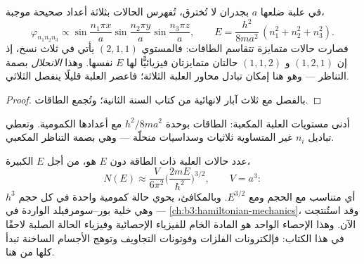 \begin{proposition}\label{prop:b3:schrodinger-three-dimensions:box}
في علبة ضلعها $a$ بجدران لا تُخترق، تُفهرس الحالات
بثلاثة أعداد صحيحة موجبة،
\[
\varphi_{n_1n_2n_3} \propto
\sin\frac{n_1\pi x}{a}\sin\frac{n_2\pi y}{a}\sin\frac{n_3\pi z}{a} ,
\qquad
E = \frac{h^2}{8ma^2}\,(n_1^2 + n_2^2 + n_3^2) .
\]
فصارت حالات متمايزة تتقاسم الطاقات: فالمستوي $(2,1,1)$ يأتي في
ثلاث نسخ، إذ إن $(1,2,1)$ و $(1,1,2)$ حالتان متمايزتان
فيزيائيًّا لها $E$ نفسها. وهذا \emph{الانحلال} بصمة
التناظر --- وهو هنا إمكان تبادل محاور العلبة الثلاثة؛
فاعصر العلبة قليلًا ينفصل الثلاثي.
\end{proposition}

\begin{proof}
بالفصل مع ثلاث آبار لانهائية من كتاب السنة الثانية؛ وتُجمع
الطاقات.
\end{proof}

\begin{omfigure}

{\small أدنى مستويات العلبة المكعبة: الطاقات بوحدة
$h^2/8ma^2$ مع أعدادها الكمومية. وتعطي تباديل $n_i$ غير
المتساوية ثلاثيات وسداسيات منحلّة --- وهي بصمة
التناظر المكعبي.}
\end{omfigure}

\begin{proposition}\label{prop:b3:schrodinger-three-dimensions:counting}
عدد حالات العلبة ذات الطاقة دون $E$ هو، من أجل $E$ الكبيرة،
\[
N(E) \approx \frac{V}{6\pi^2}\Big(\frac{2mE}{\hbar^2}\Big)^{3/2} ,
\qquad V = a^3 :
\]
أي متناسب مع الحجم ومع $E^{3/2}$. وبالمكافئ، يحوي  حالة كمومية واحدة في كل حجم $h^3$ --- وهي خلية
بور--سومرفيلد الواردة في
\cref{ch:b3:hamiltonian-mechanics}، وقد استُنتجت الآن. وهذا الإحصاء
الواحد هو المادة الخام للفيزياء الإحصائية وفيزياء الحالة
الصلبة لاحقًا في هذا الكتاب: فإلكترونات الفلزات وفوتونات
التجاويف وتوهج الأجسام الساخنة تبدأ كلها من هنا.
\end{proposition}

